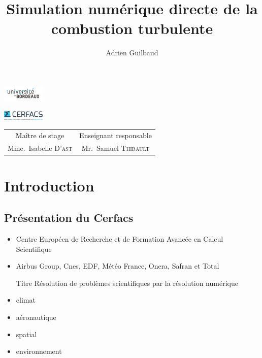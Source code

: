\documentclass{beamer}
\author{Adrien Guilbaud}
\title{Simulation numérique directe de la combustion turbulente}
\begin{document}
 

\begin{frame}
    \parbox[c]{-50cm}{\centering%
      \includegraphics[width=2cm]{figures/logo_fac.jpg}%
    }%
    \parbox[c]{19.5cm}{\centering%
      \includegraphics[width=2cm]{figures/logo_cerfacs.eps}
    }%
\maketitle

\centering
\footnotesize
\begin{tabular}{cc}
  Maître de stage & Enseignant responsable \\
  Mme.~Isabelle \textsc{D'ast} &   Mr.~Samuel \textsc{Thibault} \\
  \end{tabular}
\end{frame}

%
%

\section{Introduction}
\subsection{Présentation du Cerfacs}
\begin{frame}
  \begin{itemize}
  \item Centre Européen de Recherche et de Formation Avancée en Calcul Scientifique
  \item Airbus Group, Cnes, EDF, Météo France, Onera, Safran et Total
  
    \begin{block}{Titre}
      Résolution de problèmes scientifiques par la résolution numérique
    \end{block}
  \end{itemize}


  \begin{itemize}
  \item climat
  \item aéronautique
  \item spatial
  \item environnement
  \end{itemize}
\end{frame}
\end{document}
